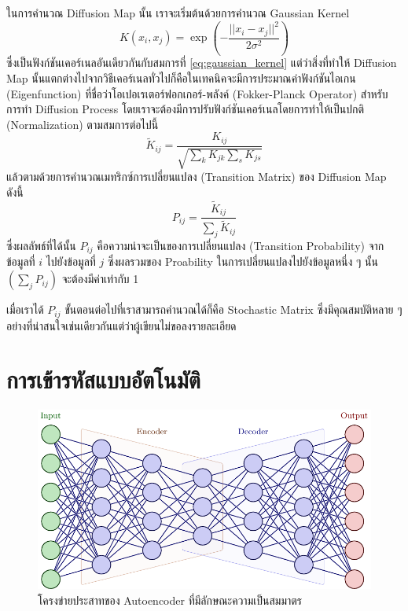 ในการคำนวณ Diffusion Map นั้น เราจะเริ่มต้นด้วยการคำนวณ Gaussian Kernel
%
\begin{equation}
    K(x_{i}, x_{j}) = \exp \left( -\frac{||x_i-x_j||^2}{2\sigma^2} \right)
\end{equation}
%
\noindent ซึ่งเป็นฟังก์ชันเคอร์เนลอันเดียวกันกับสมการที่ \eqref{eq:gaussian_kernel} แต่ว่าสิ่งที่ทำให้ Diffusion Map นั้นแตกต่างไปจากวิธีเคอร์เนลทั่วไปก็คือในเทคนิคจะมีการประมาณค่าฟังก์ชันไอเกน (Eigenfunction) ที่ชื่อว่าโอเปอเรเตอร์ฟอกเกอร์-พลังค์ (Fokker-Planck Operator) สำหรับการทำ Diffusion Process\autocite{trstanova2020} โดยเราจะต้องมีการปรับฟังก์ชันเคอร์เนลโดยการทำให้เป็นปกติ (Normalization)\autocite{nadler2006} ตามสมการต่อไปนี้
%
\begin{equation}
    \tilde{K}_{ij} = \frac{K_{ij}}{\sqrt{\sum_{k}K_{jk} \sum_{s}K_{js}}}
\end{equation}
%
\noindent แล้วตามด้วยการคำนวณเมทริกซ์การเปลี่ยนแปลง (Transition Matrix) ของ Diffusion Map ดังนี้
%
\begin{equation}
    P_{ij} = \frac{\tilde{K}_{ij}}{\sum_{j}\tilde{K}_{ij}}
\end{equation}
%
\noindent ซึ่งผลลัพธ์ที่ได้นั้น $P_{ij}$ คือความน่าจะเป็นของการเปลี่ยนแปลง (Transition Probability) จากข้อมูลที่ $i$ ไปยังข้อมูลที่ $j$ ซึ่งผลรวมของ Proability ในการเปลี่ยนแปลงไปยังข้อมูลหนึ่ง ๆ นั้น $(\sum_{j}P_{ij})$ จะต้องมีค่าเท่ากับ 1 

เมื่อเราได้ $P_{ij}$ ขั้นตอนต่อไปที่เราสามารถคำนวณได้ก็คือ Stochastic Matrix ซึ่งมีคุณสมบัติหลาย ๆ อย่างที่น่าสนใจเช่นเดียวกันแต่ว่าผู้เขียนไม่ขอลงรายละเอียด

\section{การเข้ารหัสแบบอัตโนมัติ}
\label{sec:autoencoder}

\begin{figure}[H]
    \centering
    \includegraphics[width=0.7\linewidth]{fig/autoencoder.pdf}
    \caption{โครงข่ายประสาทของ Autoencoder ที่มีลักษณะความเป็นสมมาตร}
    \label{fig:autoencoder}
\end{figure}

